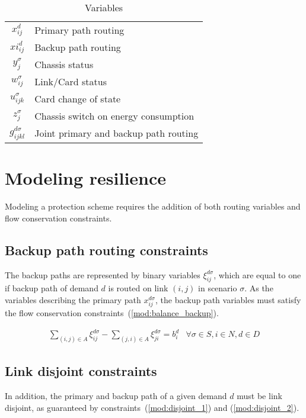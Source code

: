\documentclass[final,5p,times,twocolumn]{elsarticle}
\begin{document}
\begin{table}[htc]
\begin{tabular}{c|l}
\hline
$x_{ij}^d$ & Primary path routing\\
$xi_{ij}^d$ & Backup path routing\\
$y_j^{\sigma}$ & Chassis status\\$w_{ij}^{\sigma}$ & Link/Card status\\$u_{ijk}^{\sigma}$ & Card change of state\\$z_j^\sigma$ & Chassis switch on energy consumption\\$g_{ijkl}^{d \sigma}$ & Joint primary and backup path routing\\
\hline
\end{tabular}
\caption{Variables} \label{tab::variables}
\end{table}



\section{Modeling resilience}\label{sec:resilience}


Modeling a protection scheme requires the addition of both routing variables and flow conservation constraints. 

\subsection{Backup path routing constraints}
The backup paths are represented by binary variables $\xi_{ij}^{d\sigma}$, which are equal to one if backup path of demand $d$ is routed on link $(i,j)$ in scenario $\sigma$. As the variables describing the primary path $x_{ij}^{d \sigma}$, the backup path variables must satisfy the flow conservation constraints~(\ref{mod:balance_backup}).


\begin{eqnarray}\label{mod:balance_backup}
\sum_{(i,j) \in A} \xi_{ij}^{d \sigma} - \sum_{(j,i)\in A} \xi_{ji}^{d \sigma}= b_i^d &   \forall \sigma \in S,i \in N, d \in D 
\end{eqnarray}

\subsection{Link disjoint constraints}

In addition, the primary and backup path of a given demand $d$ must be link disjoint, as guaranteed by constraints~(\ref{mod:disjoint_1}) and (\ref{mod:disjoint_2}).
\end{document}
